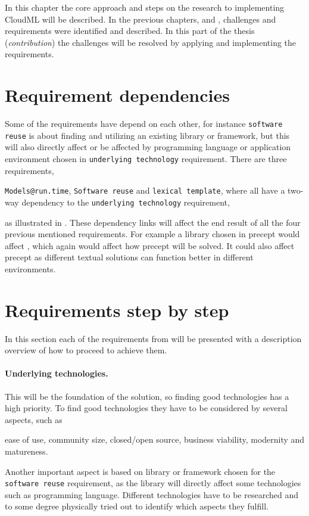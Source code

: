%

In this chapter the core approach and steps on the research to implementing CloudML will be described.
In the previous chapters,  and , 
challenges and requirements were identified and described.
In this part of the thesis (\emph{contribution}) the challenges will be resolved
by applying and implementing the requirements.

\section{Requirement dependencies}


Some of the requirements have depend on each other, for instance \texttt{software reuse} is about finding
and utilizing an existing library or framework, but this will also directly affect or be affected by
programming language or application environment chosen in \texttt{underlying technology} requirement.
There are three requirements, 
\begin{ii}
  \iitem \texttt{Models@run.time},
  \iitem \texttt{Software reuse} and
  \iitem \texttt{lexical template},
    where all have a two-way dependency to the 
  \iitem \texttt{underlying technology} requirement,
\end{ii}
as illustrated in .
These dependency links will affect the end result of all the four previous mentioned requirements.
For example a library chosen in precept  would affect , which again would affect
how precept  will be solved. 
It could also affect precept  as different textual solutions can function better in
different environments.

\section{Requirements step by step}

In this section each of the requirements from  will be presented 
with a description overview of how to proceed to achieve them.

\paragraph{Underlying technologies.}

This will be the foundation of the solution, so finding good technologies has a high priority.
To find good technologies they have to be considered by several aspects, such as
\begin{ii}
  \iitem ease of use,
  \iitem community size,
  \iitem closed/open source,
  \iitem business viability,
  \iitem modernity and 
  \iitem matureness.
\end{ii}
Another important aspect is based on library or framework chosen for the \texttt{software reuse} requirement,
as the library will directly affect some technologies such as programming language.
Different technologies have to be researched and to some degree physically tried out to identify
which aspects they fulfill.


